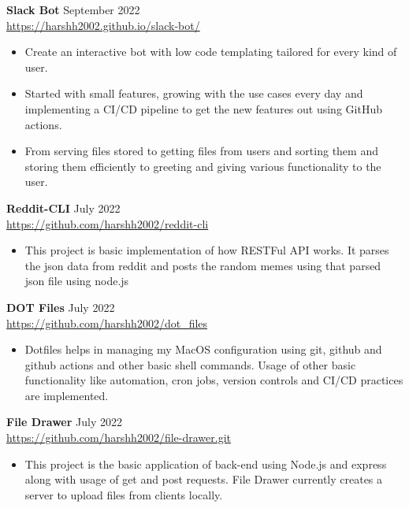 \documentclass[a4paper]{article}
\begin{document}
{\textbf{Slack Bot}} \hfill September 2022 \\
\vspace{-1mm}
\url{https://harshh2002.github.io/slack-bot/} \\
\vspace{-2mm}
\begin{itemize} 
	\item Create an interactive bot with low code templating tailored for every kind of user.
    \item Started with small features, growing with the use cases every day and implementing a CI/CD pipeline to get the new features out using GitHub actions.
    \item From serving files stored to getting files from users and sorting them and storing them efficiently to greeting and giving various functionality to the user.
\end{itemize}
{\textbf{Reddit-CLI}} \hfill July 2022 \\
\vspace{-1mm}
\url{https://github.com/harshh2002/reddit-cli} \\
\vspace{-2mm}
\begin{itemize} 
	\item This project is basic implementation of how RESTFul API works. It parses the json data from reddit and posts the random memes using that parsed json file using node.js
\end{itemize}
{\textbf{DOT Files}} \hfill July 2022 \\
\vspace{-1mm}
\url{https://github.com/harshh2002/dot_files} \\
\vspace{-2mm}
\begin{itemize} 
    \item Dotfiles helps in managing my MacOS configuration using git, github and github actions and other basic shell commands. Usage of other basic functionality like automation, cron jobs, version controls and CI/CD practices are implemented.
\end{itemize}
{\textbf{File Drawer}} \hfill July 2022 \\
\vspace{-2mm}
\url{https://github.com/harshh2002/file-drawer.git} \\
\vspace{-2mm}
\begin{itemize} 
	\item This project is the basic application of back-end using Node.js and express along with usage of get and post requests. File Drawer currently creates a server to upload files from clients locally.
\end{itemize}
\end{document}
